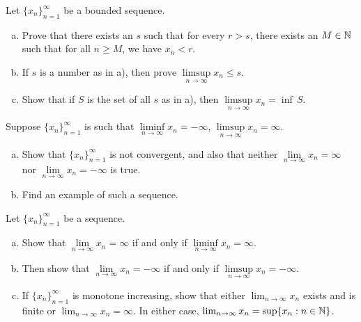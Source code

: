 \begin{exercise}
Let $\{x_n\}_{n=1}^\infty$ be a bounded sequence.
\begin{enumerate}[a)]
\item
Prove that there exists an $s$ such that for every $r > s$, there exists 
an $M \in {\mathbb{N}}$ such that for all $n \geq M$, we have
$x_n < r$.
\item
If $s$ is a number as in a), then prove $\limsup\limits_{n\to\infty} x_n \leq s$.
\item
Show that if $S$ is the set of all $s$ as in a), then
$\limsup\limits_{n\to\infty} x_n = \inf \, S$.
\end{enumerate}
\end{exercise}

\begin{exercise}[Easy] \label{exercise:infseqlimex}
\pagebreak[2]
Suppose $\{ x_n \}_{n=1}^\infty$ is such that $\liminf\limits_{n\to\infty} x_n = -\infty$,
$\limsup\limits_{n\to\infty} x_n = \infty$.
\begin{enumerate}[a)]
\item
Show that $\{ x_n \}_{n=1}^\infty$ is not convergent, and also
that neither $\lim\limits_{n\to\infty} x_n = \infty$
nor $\lim\limits_{n\to\infty} x_n = -\infty$
is true.
\item
Find an example of such a sequence.
\end{enumerate}
\end{exercise}

\begin{exercise} \label{exercise:infseqlimlims}
Let $\{ x_n \}_{n=1}^\infty$ be a sequence.
\begin{enumerate}[a)]
\item
Show that
$\lim\limits_{n\to\infty} x_n = \infty$ if and only if
$\liminf\limits_{n\to\infty} x_n = \infty$.
\item
Then show that $\lim\limits_{n\to\infty} x_n = - \infty$ if and only if
$\limsup\limits_{n\to\infty} x_n = -\infty$.
\item
If $\{ x_n \}_{n=1}^\infty$ is monotone increasing, show that either
$\lim_{n\to\infty} x_n$ exists and is finite or $\lim_{n\to\infty} x_n = \infty$.  In either
case, $\lim_{n\to\infty} x_n = \sup \{ x_n : n \in {\mathbb{N}} \}$.
\end{enumerate}
\end{exercise}

